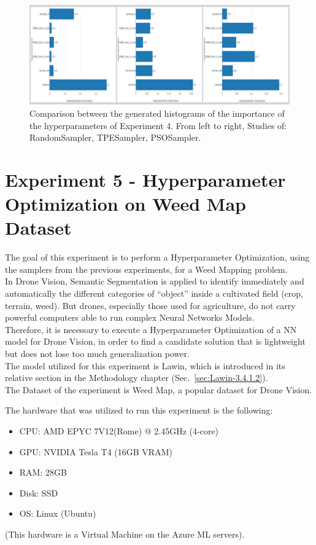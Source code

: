 \begin{figure}[t]
	\centering
	\includegraphics[width=15cm]{figures/figure-4.4.1.png}
	\caption[Hyperparameters Importance Histograms Experiment 4]{Comparison between the generated histograms of the importance of the hyperparameters of Experiment 4. From left to right, Studies of: RandomSampler, TPESampler, PSOSampler.}
	\label{fig:figure-4.4.1}
\end{figure}

\section[Experiment 5 - HPO on Weed Map Dataset]{Experiment 5 - Hyperparameter Optimization on Weed Map Dataset}

The goal of this experiment is to perform a Hyperparameter Optimization, using the samplers from the previous experiments, for a Weed Mapping problem.
\\[0.3cm]In Drone Vision, Semantic Segmentation is applied to identify immediately and automatically the different categories of “object” inside a cultivated field (crop, terrain, weed). But drones, especially those used for agriculture, do not carry powerful computers able to run complex Neural Networks Models.
\\[0.3cm]Therefore, it is necessary to execute a Hyperparameter Optimization of a NN model for Drone Vision, in order to find a candidate solution that is lightweight but does not lose too much generalization power.
\\[0.3cm]The model utilized for this experiment is Lawin, which is introduced in its relative section in the Methodology chapter (Sec.~\ref{sec:Lawin-3.4.1.2}).
\\[0.3cm]The Dataset of the experiment is Weed Map, a popular dataset for Drone Vision.

The hardware that was utilized to run this experiment is the following:
\begin{itemize}[itemsep=0.1cm]
	\item CPU: AMD EPYC 7V12(Rome) @ 2.45GHz (4-core)
	\item GPU: NVIDIA Tesla T4 (16GB VRAM)
	\item RAM: 28GB
	\item Disk: SSD
	\item OS: Linux (Ubuntu)
\end{itemize}
(This hardware is a Virtual Machine on the Azure ML servers).


